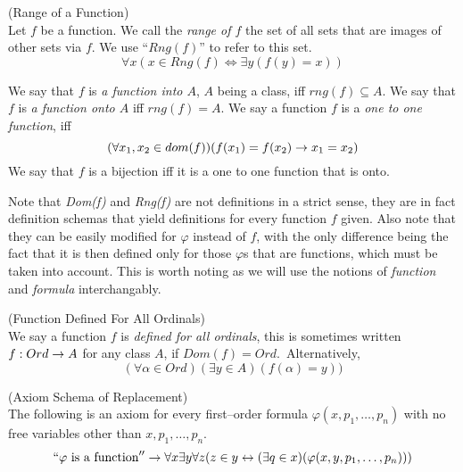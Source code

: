 \begin{definition}{(Range of a Function)}\label{def:rng}\\
Let $f$ be a function. We call the \emph{range of $f$} the set of all sets that are images of other sets via $f$. We use ``$Rng(f)$'' to refer to this set. %
\begin{equation}
\forall x (x \in Rng(f) \iff \exists y (f(y) = x))
\end{equation}
\end{definition}
We say that $f$ is \emph{a function into $A$}, $A$ being a class, iff $rng(f) \subseteq A$.
We say that $f$ is \emph{a function onto $A$} iff $rng(f) = A$. %
We say a function $f$ is a \emph{one to one function}, iff
\begin{equation}
(\forall x_1, x_2 \in dom(f))(f(x_1) = f(x_2) \rightarrow x_1 = x_2)
\end{equation}
We say that $f$ is a bijection iff it is a one to one function that is onto.

Note that \emph{Dom(f)} and \emph{Rng(f)} are not definitions in a strict sense, they are in fact definition schemas that yield definitions for every function $f$ given. Also note that they can be easily modified for $\varphi$ instead of $f$, with the only difference being the fact that it is then defined only for those $\varphi$s that are functions, which must be taken into account. This is worth noting as we will use the notions of \emph{function} and \emph{formula} interchangably.

\begin{definition}{(Function Defined For All Ordinals)}\label{def:function_dfao}\\
We say a function $f$ is \emph{defined for all ordinals}, this is sometimes written $f: Ord \rightarrow A$ for any class $A$, if $Dom(f) = Ord$.\
Alternatively,
\begin{equation}
(\forall \alpha \in Ord)(\exists y \in A)(f(\alpha) = y))
\end{equation}
\end{definition}

\begin{definition}{(Axiom Schema of Replacement)}\label{def:replacement}\\
The following is an axiom for every first–order formula $\varphi(x, p_1, \ldots, p_n)$ with no free variables other than $x, p_1, \ldots, p_n$.
\begin{equation}
``\varphi\mbox{ is a function}''\rightarrow \forall x \exists y \forall z (z \in y \leftrightarrow (\exists q \in x)(\varphi(x, y, p_1, \ldots, p_n)))
\end{equation}
\end{definition}

